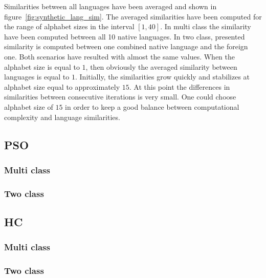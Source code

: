 \documentclass{mini}
\begin{document}
Similarities between all languages have been averaged and shown in figure~\ref{fig:synthetic_lang_sim}. The averaged similarities have been computed for the range of alphabet sizes in the interval $[1, 40]$. In multi class the similarity have been computed between all 10 native languages. In two class, presented similarity is computed between one combined native language and the foreign one. Both scenarios have resulted with almost the same values. When the alphabet size is equal to $1$, then obviously the averaged similarity between languages is equal to $1$. Initially, the similarities grow quickly and stabilizes at alphabet size equal to approximately $15$. At this point the differences in similarities between consecutive iterations is very small. One could choose alphabet size of $15$ in order to keep a good balance between computational complexity and language similarities.

\makeFigureSyntheticAvgSimlarity


\subsection{PSO}

\subsubsection{Multi class}

\makeFigureSyntheticMulti

\subsubsection{Two class}

\makeFigureSyntheticTwo

\subsection{HC}

\subsubsection{Multi class}

\makeFigureHCSyntheticMulti

\subsubsection{Two class}

\makeFigureHCSyntheticTwo
\end{document}
